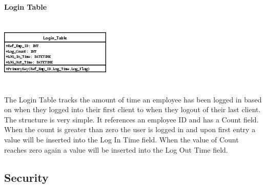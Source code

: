 \documentclass{report}
\begin{document}
\begin{itemize}
        {\bf Login Table}\\
        \\
        \\
        \includegraphics{Tables/LoginTable.png}\\
        \\
        \\
        The Login Table tracks the amount of time an employee has been logged in based on when
        they logged into their first client to when they logout of their last client. The structure
        is very simple. It references an employee ID and has a Count field. When the count is greater
        than zero the user is logged in and upon first entry a value will be inserted into the
        Log In Time field. When the value of Count reaches zero again a value will be inserted into
        the Log Out Time field.

        \subsection{Security}


\end{itemize}
\end{document}
